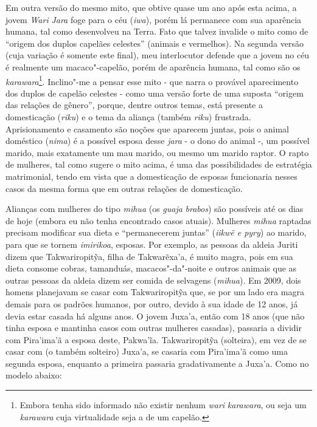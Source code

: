 Em outra versão do mesmo mito, que obtive quase um ano após esta acima,
a jovem \emph{Wari} \emph{Jara} foge para o céu (\emph{iwa}), porém lá
permanece com sua aparência humana, tal como desenvolveu na Terra. Fato
que talvez invalide o mito como de ``origem dos duplos capelães celestes''
(animais e vermelhos). Na segunda versão (cuja variação é somente este
final), meu interlocutor defende que a jovem no céu é realmente um
macaco"-capelão, porém de aparência humana, tal como são os
\emph{karawara}\footnote{Embora tenha sido informado não existir nenhum
  \emph{wari} \emph{karawara}, ou seja um \emph{karawara} cuja
  virtualidade seja a de um capelão.}. Inclino"-me a pensar esse mito -
que narra o provável aparecimento dos duplos de capelão celestes - como
uma versão forte de uma suposta ``origem das relações de gênero'', porque,
dentre outros temas, está presente a domesticação (\emph{riku}) e o tema
da aliança (também \emph{riku}) frustrada. Aprisionamento e casamento
são noções que aparecem juntas, pois o animal doméstico (\emph{nima}) é
a possível esposa desse \emph{jara} - o dono do animal -, um possível
marido, mais exatamente um mau marido, ou mesmo um marido raptor. O
rapto de mulheres, tal como sugere o mito acima, é uma das
possibilidades de estratégia matrimonial, tendo em vista que a
domesticação de esposas funcionaria nesses casos da mesma forma que em
outras relações de domesticação.

Alianças com mulheres do tipo \emph{mihua} (os \emph{guaja}
\emph{brabos}) são possíveis até os dias de hoje (embora eu não tenha
encontrado casos atuais). Mulheres \emph{mihua} raptadas precisam
modificar sua dieta e ``permanecerem juntas'' (\emph{iikwẽ e pyry}) ao
marido, para que se tornem \emph{imirikoa}, esposas. Por exemplo, as
pessoas da aldeia Juriti dizem que Takwariropitỹa, filha de Takwarẽxa'a,
é muito magra, pois em sua dieta consome cobras, tamanduás,
macacos"-da"-noite e outros animais que as outras pessoas da aldeia dizem
ser comida de selvagens (\emph{mihua}). Em 2009, dois homens planejavam
se casar com Takwariropitỹa que, se por um lado era magra demais para os
padrões humanos, por outro, devido à sua idade de 12 anos, já devia
estar casada há alguns anos. O jovem Juxa'a, então com 18 anos (que não
tinha esposa e mantinha casos com outras mulheres casadas), passaria a
dividir com Pira'ima'ã a esposa deste, Pakwa'ĩa. Takwariropitỹa
(solteira), em vez de se casar com (o também solteiro) Juxa'a, se
casaria com Pira'ima'ã como uma segunda esposa, enquanto a primeira
passaria gradativamente a Juxa'a. Como no modelo abaixo:

